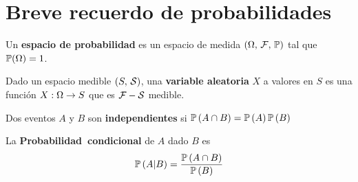\section{Breve recuerdo de probabilidades}

\begin{definition}
Un \textbf{espacio de probabilidad} es un espacio de medida $(\om,\, \cal{F},\, \prob)$ tal que $\prob(\om) = 1$.
\end{definition}

\begin{definition}
Dado un espacio medible $(S,\, \cal{S})$, una \textbf{variable aleatoria} $X$ a valores en $S$ es una función $X:\om\to S$ que es $\cal{F}- \cal{S}$ medible.
\end{definition}

\begin{definition}[Independencia]
Dos eventos $A$ y $B$ son \textbf{independientes} si $\probf{A\cap B} = \probf{A} \probf{B}$
\end{definition}

\begin{definition}
La \textbf{Probabilidad~condicional} de $A$ dado $B$ es
\begin{equation}
    \probf{A|B} = \frac{\probf{A \cap B}}{\probf{B}}
\end{equation}
\end{definition}